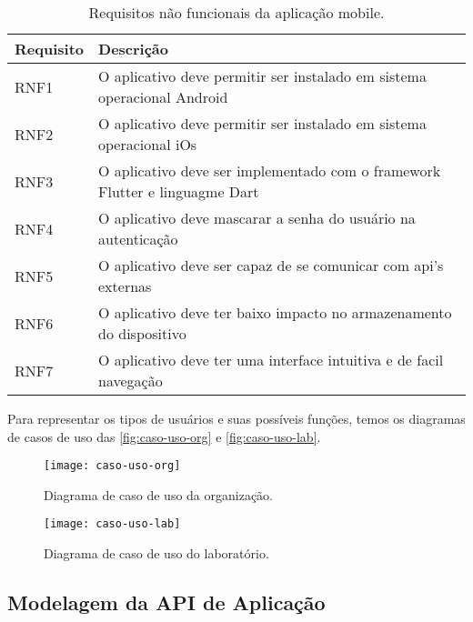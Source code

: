 \begin{table}[H]
  \caption{Requisitos não funcionais da aplicação mobile.}
  \label{tab:requisitos_nao_funcionais_app}
  \begin{tabularx}{\textwidth}{l|l}
    \hline
    \textbf{Requisito} & \textbf{Descrição}                                                          \\ \hline
    RNF1               & O aplicativo deve permitir ser instalado em sistema operacional Android     \\
    RNF2               & O aplicativo deve permitir ser instalado em sistema operacional iOs         \\
    RNF3               & O aplicativo deve ser implementado com o framework Flutter e linguagme Dart \\
    RNF4               & O aplicativo deve mascarar a senha do usuário na autenticação               \\
    RNF5               & O aplicativo deve ser capaz de se comunicar com \gls{api}'s externas        \\
    RNF6               & O aplicativo deve ter baixo impacto no armazenamento do dispositivo         \\
    RNF7               & O aplicativo deve ter uma interface intuitiva e de facil navegação          \\ \hline
  \end{tabularx}
  \fonte{}
\end{table}

Para representar os tipos de usuários e suas possíveis funções, temos os diagramas de casos de uso das \autoref{fig:caso-uso-org} e \autoref{fig:caso-uso-lab}.

\begin{figure}[H]
  \captionsetup{width=0.43\textwidth}
  \caption{Diagrama de caso de uso da organização.}
  \label{fig:caso-uso-org}
  \texttt{[image: caso-uso-org]}
  \fonte{}
\end{figure}

\begin{figure}[H]
  \captionsetup{width=0.43\textwidth}
  \caption{Diagrama de caso de uso do laboratório.}
  \label{fig:caso-uso-lab}
  \texttt{[image: caso-uso-lab]}
  \fonte{}
\end{figure}

\subsection{Modelagem da API de Aplicação}\label{subsec:modelagem_api}

